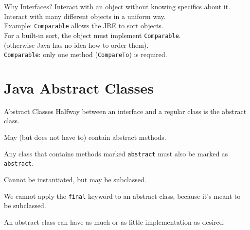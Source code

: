 \documentclass[aspectratio=169]{beamer}
\begin{document}
\begin{frame}{Why Interfaces?}
Interact with an object without knowing specifics about it. \\
\vspace{1em}
Interact with many different objects in a uniform way. \\
\vspace{1em}
Example: \texttt{Comparable} allows the JRE to sort objects. \\
\vspace{1em}
For a built-in sort, the object must implement \texttt{Comparable}.\\ \quad (otherwise Java has no idea how to order them). \\
\vspace{1em}
\texttt{Comparable}: only one method (\texttt{CompareTo}) is required.
\end{frame}



\section*{Java Abstract Classes}



\begin{frame}{Abstract Classes}
Halfway between an interface and a regular class is the \alert{abstract class}.

May (but does not have to) contain abstract methods. 

Any class that contains methods marked \texttt{abstract} must also be marked as \texttt{abstract}. 

Cannot be instantiated, but may be subclassed. 

We cannot apply the \texttt{final} keyword to an abstract class, because it's meant to be subclassed.

An abstract class can have as much or as little implementation as desired.
\end{frame}
\end{document}
